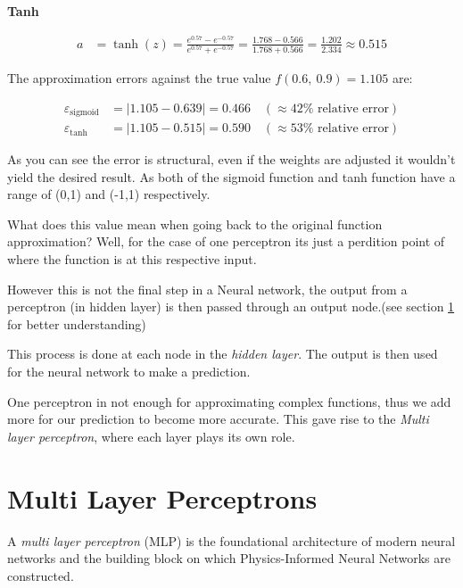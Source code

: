\documentclass[12pt, a4paper]{article}
\begin{document}
\noindent\textbf{Tanh}

\begin{align*}
    a &= \tanh(z)
       = \frac{e^{0.57} - e^{-0.57}}{e^{0.57} + e^{-0.57}}
       = \frac{1.768 - 0.566}{1.768 + 0.566}
       = \frac{1.202}{2.334}
       \approx 0.515
\end{align*}

\noindent The approximation errors against the true value
$f(0.6,\ 0.9) = 1.105$ are:

\begin{align*}
    \varepsilon_{\text{sigmoid}}
        &= |1.105 - 0.639| = 0.466
        \quad \left( \approx 42\% \text{ relative error} \right) \\
    \varepsilon_{\text{tanh}}
        &= |1.105 - 0.515| = 0.590
        \quad \left( \approx 53\% \text{ relative error} \right)
\end{align*}

 As you can see the error is structural, even if the weights are adjusted it wouldn't yield the desired result. As both of the sigmoid function and tanh function have a range of (0,1) and (-1,1) respectively. 
 

What does this value mean when going back to the original function approximation? Well, for the case of one perceptron its just a perdition point of where the function is at this respective input.

However this is not the final step in a Neural network, the output from a perceptron (in hidden layer) is then passed through an output node.(see section \ref{sec:mlp} for better understanding)

This process is done at each node in the \emph{hidden layer}. The output is then used for the neural network to make a prediction.

One perceptron in not enough for approximating complex functions, thus we add more for our prediction to become more accurate. This gave rise to the \emph{Multi layer perceptron}, where each layer plays its own role. \citep{minsky1969}


\newpage
\section{Multi Layer Perceptrons}
\label{sec:mlp}

A \emph{multi layer perceptron} (MLP) is the foundational architecture of modern
neural networks and the building block on which Physics-Informed Neural Networks
are constructed.
\end{document}
